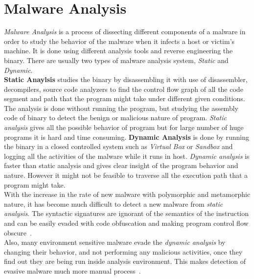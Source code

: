 \section{Malware Analysis}
\label{sec:Malware Analysis}
\emph{Malware Analysis} is a process of dissecting different components of a malware in order to study the behavior of the malware when it infects a host or victim's machine. It is done using different analysis tools and reverse engineering the binary.
There are usually two types of malware analysis system, \emph{Static} and \emph{Dynamic}.\\
\textbf{Static Anaylsis} studies the binary by disassembling it with use of disassembler, decompilers, source code analyzers to find the control flow graph of all the code segment and path that the program might take under different given conditions.
The analysis is done without running the program, but studying the assembly code of binary to detect the benign or malicious nature of program.
\emph{Static analysis} gives all the possible behavior of program but for large number of huge programs it is hard and time consuming.
\textbf{Dynamic Analysis} is done by running the binary in a closed controlled system such as \emph{Virtual Box} or \emph{Sandbox} and logging all the activities of the malware while it runs in host.
\emph{Dynamic analysis} is faster than static analysis and gives clear insight of the program behavior and nature.
However it might not be feasible to traverse all the execution path that a program might take.
\\
With the increase in the rate of new malware with polymorphic and metamorphic nature, it has become much difficult to detect a new malware from \emph{static analysis}.
The syntactic signatures are ignorant of the semantics of the instruction and can be easily evaded with code obfuscation and making program control flow obscure~\cite[]{staticlimit}.\\
Also, many environment sensitive malware evade the \emph{dynamic analysis} by changing their behavior, and not performing any malicious activities, once they find out they are being run inside analysis environment.
This makes detection of evasive malware much more manual process~\cite[]{barecloud}.

